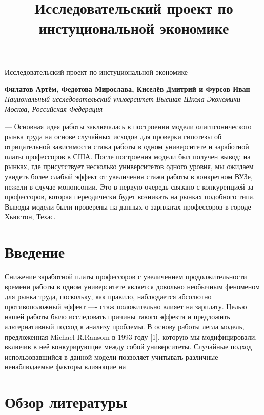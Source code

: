 \documentclass[a4paper, 12pt]{article}
\title{Исследовательский проект по инстуциональной экономике}
\theoremstyle{definition}
\theoremstyle{plain}
\begin{document}
\begin{center}
{\Large\sc Исследовательский проект по инстуциональной экономике}\vspace{0.2cm}\\
\end{center}
\begin{center}
{\bf Филатов Артём, Федотова Мирослава, Киселёв Дмитрий и Фурсов Иван}\vspace{0.1cm}\\
{\it Национальный исследовательский университет Высшая Школа Экономики\\ 
Москва, Российская Федерация}\vspace{0.1cm}\\
\end{center}


— Основная идея работы заключалась в построении модели олигпсонического рынка труда на основе случайных исходов для проверки гипотезы об отрицательной зависимости стажа работы в одном университете и заработной платы профессоров в США. После построения модели был получен вывод: на рынках, где присутствует несколько университетов одного уровня, мы ожидаем увидеть более слабый эффект от увеличения стажа работы в конкретном ВУЗе, нежели в случае монопсонии. Это в первую очередь связано с конкуренцией за профессоров, которая переодически будет возникать на рынках подобного типа. Выводы модели были проверены на данных о зарплатах профессоров в городе Хьюстон, Техас. 

\section{Введение}
Снижение заработной платы профессоров с увеличением продолжительности времени работы в одном университете является довольно необычным феноменом для рынка труда, поскольку, как правило, наблюдается абсолютно противоположный эффект —- стаж положительно влияет на зарплату. Целью нашей работы было исследовать причины такого эффекта и предложить альтернативный подход к анализу проблемы. В основу работы легла модель, предложенная Michael R.Ransom в 1993 году [1], которую мы модифицировали, включив в неё конкурирующие между собой университеты. Случайные подход использовавшийся в данной модели позволяет учитывать различные ненаблюдаемые факторы влияющие на 

\section{Обзор литературы}
\end{document}
